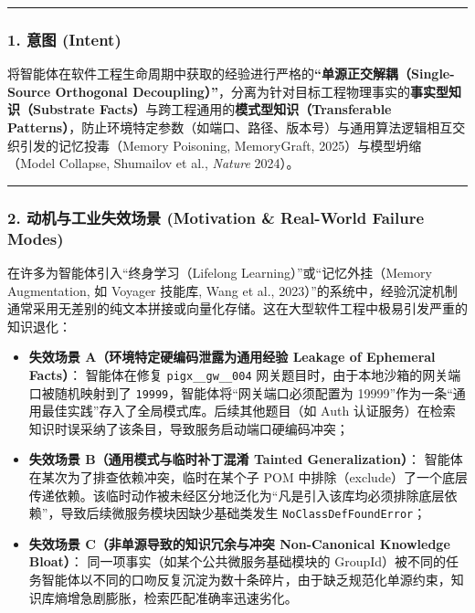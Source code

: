 \begin{center}\rule{0.5\linewidth}{0.5pt}\end{center}

\subsubsection{1. 意图 (Intent)}\label{ux610fux56fe-intent-12}

将智能体在软件工程生命周期中获取的经验进行严格的\textbf{``单源正交解耦（Single-Source
Orthogonal
Decoupling）''}，分离为针对目标工程物理事实的\textbf{事实型知识（Substrate
Facts）}与跨工程通用的\textbf{模式型知识（Transferable
Patterns）}，防止环境特定参数（如端口、路径、版本号）与通用算法逻辑相互交织引发的记忆投毒（Memory
Poisoning, MemoryGraft, 2025）与模型坍缩（Model Collapse, Shumailov et
al., \emph{Nature} 2024）。

\begin{center}\rule{0.5\linewidth}{0.5pt}\end{center}

\subsubsection{2. 动机与工业失效场景 (Motivation \& Real-World Failure
Modes)}\label{ux52a8ux673aux4e0eux5de5ux4e1aux5931ux6548ux573aux666f-motivation-real-world-failure-modes-12}

在许多为智能体引入``终身学习（Lifelong Learning）''或``记忆外挂（Memory
Augmentation, 如 Voyager 技能库, Wang et al.,
2023）''的系统中，经验沉淀机制通常采用无差别的纯文本拼接或向量化存储。这在大型软件工程中极易引发严重的知识退化：

\begin{itemize}
\tightlist
\item
  \textbf{失效场景 A（环境特定硬编码泄露为通用经验 Leakage of Ephemeral
  Facts）}： 智能体在修复 \texttt{pigx\_\_gw\_\_004}
  网关题目时，由于本地沙箱的网关端口被随机映射到了
  \texttt{19999}，智能体将``网关端口必须配置为
  19999''作为一条``通用最佳实践''存入了全局模式库。后续其他题目（如 Auth
  认证服务）在检索知识时误采纳了该条目，导致服务启动端口硬编码冲突；
\item
  \textbf{失效场景 B（通用模式与临时补丁混淆 Tainted Generalization）}：
  智能体在某次为了排查依赖冲突，临时在某个子 POM
  中排除（exclude）了一个底层传递依赖。该临时动作被未经区分地泛化为``凡是引入该库均必须排除底层依赖''，导致后续微服务模块因缺少基础类发生
  \texttt{NoClassDefFoundError}；
\item
  \textbf{失效场景 C（非单源导致的知识冗余与冲突 Non-Canonical Knowledge
  Bloat）}： 同一项事实（如某个公共微服务基础模块的
  GroupId）被不同的任务智能体以不同的口吻反复沉淀为数十条碎片，由于缺乏规范化单源约束，知识库熵增急剧膨胀，检索匹配准确率迅速劣化。
\end{itemize}

